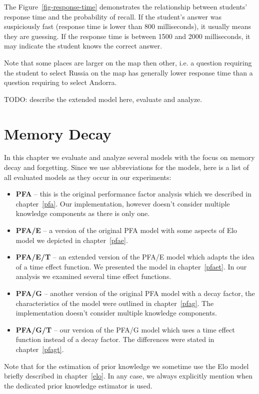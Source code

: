 The Figure~\ref{fig-response-time} demonstrates the relationship between students' response time and the probability of recall. If the student's answer was suspiciously fast (response time is lower than 800 milliseconds), it usually means they are guessing. If the response time is between 1500 and 2000 milliseconds, it may indicate the student knows the correct answer.

Note that some places are larger on the map then other, i.e. a question requiring the student to select Russia on the map has generally lower response time than a question requiring to select Andorra.

TODO: describe the extended model here, evaluate and analyze.

\section{Memory Decay}

In this chapter we evaluate and analyze several models with the focus on memory decay and forgetting. Since we use abbreviations for the models, here is a list of all evaluated models as they occur in our experiments:

\begin{itemize}
  \item \textbf{PFA} -- this is the original performance factor analysis which we described in chapter~\ref{pfa}. Our implementation, however doesn't consider multiple knowledge components as there is only one.
  \item \textbf{PFA/E} -- a version of the original PFA model with some aspects of Elo model we depicted in chapter~\ref{pfae}.
  \item \textbf{PFA/E/T} -- an extended version of the PFA/E model which adapts the idea of a time effect function. We presented the model in chapter~\ref{pfaet}. In our analysis we examined several time effect functions.
  \item \textbf{PFA/G} -- another version of the original PFA model with a decay factor, the characteristics of the model were outlined in chapter~\ref{pfag}. The implementation doesn't consider multiple knowledge components.
  \item \textbf{PFA/G/T} -- our version of the PFA/G model which uses a time effect function instead of a decay factor. The differences were stated in chapter~\ref{pfagt}.
\end{itemize}

Note that for the estimation of prior knowledge we sometime use the Elo model briefly described in chapter~\ref{elo}. In any case, we always explicitly mention when the dedicated prior knowledge estimator is used.

